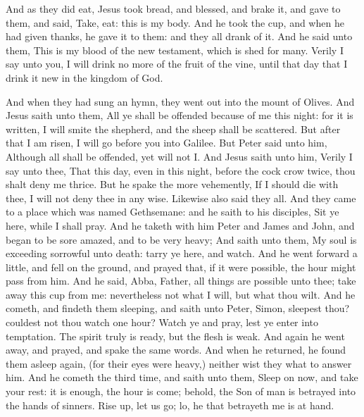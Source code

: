  And as they did eat, Jesus took bread, and blessed, and
brake it, and gave to them, and said, Take, eat: this is my body.
 And he took the cup, and when he had given thanks, he
gave it to them: and they all drank of it.  And he said
unto them, This is my blood of the new testament, which is shed for
many.  Verily I say unto you, I will drink no more of the
fruit of the vine, until that day that I drink it new in the kingdom of
God.

 And when they had sung an hymn, they went out into the
mount of Olives.  And Jesus saith unto them, All ye shall
be offended because of me this night: for it is written, I will smite
the shepherd, and the sheep shall be scattered.  But
after that I am risen, I will go before you into Galilee.
 But Peter said unto him, Although all shall be offended,
yet will not I.  And Jesus saith unto him, Verily I say
unto thee, That this day, even in this night, before the cock crow
twice, thou shalt deny me thrice.  But he spake the more
vehemently, If I should die with thee, I will not deny thee in any wise.
Likewise also said they all.  And they came to a place
which was named Gethsemane: and he saith to his disciples, Sit ye here,
while I shall pray.  And he taketh with him Peter and
James and John, and began to be sore amazed, and to be very heavy;
 And saith unto them, My soul is exceeding sorrowful unto
death: tarry ye here, and watch.  And he went forward a
little, and fell on the ground, and prayed that, if it were possible,
the hour might pass from him.  And he said, Abba, Father,
all things are possible unto thee; take away this cup from me:
nevertheless not what I will, but what thou wilt.  And he
cometh, and findeth them sleeping, and saith unto Peter, Simon, sleepest
thou? couldest not thou watch one hour?  Watch ye and
pray, lest ye enter into temptation. The spirit truly is ready, but the
flesh is weak.  And again he went away, and prayed, and
spake the same words.  And when he returned, he found
them asleep again, (for their eyes were heavy,) neither wist they what
to answer him.  And he cometh the third time, and saith
unto them, Sleep on now, and take your rest: it is enough, the hour is
come; behold, the Son of man is betrayed into the hands of sinners.
 Rise up, let us go; lo, he that betrayeth me is at hand.

